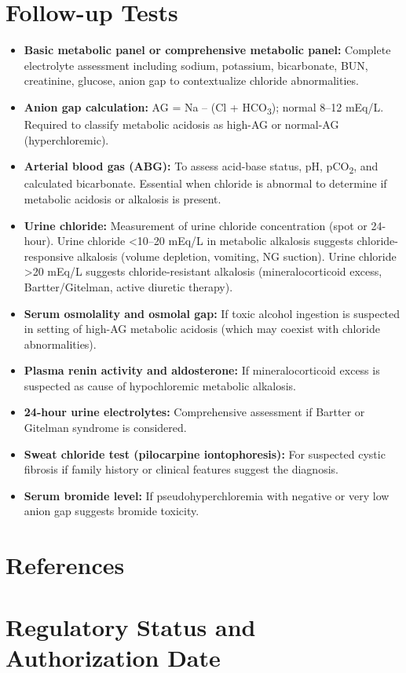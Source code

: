 \section*{Follow-up Tests}
\begin{itemize}
  \item \textbf{Basic metabolic panel or comprehensive metabolic panel:} Complete electrolyte assessment including sodium, potassium, bicarbonate, BUN, creatinine, glucose, anion gap to contextualize chloride abnormalities.
  \item \textbf{Anion gap calculation:} AG = Na -- (Cl + HCO\textsubscript{3}); normal 8--12 mEq/L. Required to classify metabolic acidosis as high-AG or normal-AG (hyperchloremic).
  \item \textbf{Arterial blood gas (ABG):} To assess acid-base status, pH, pCO\textsubscript{2}, and calculated bicarbonate. Essential when chloride is abnormal to determine if metabolic acidosis or alkalosis is present.
  \item \textbf{Urine chloride:} Measurement of urine chloride concentration (spot or 24-hour). Urine chloride <10--20 mEq/L in metabolic alkalosis suggests chloride-responsive alkalosis (volume depletion, vomiting, NG suction). Urine chloride >20 mEq/L suggests chloride-resistant alkalosis (mineralocorticoid excess, Bartter/Gitelman, active diuretic therapy).
  \item \textbf{Serum osmolality and osmolal gap:} If toxic alcohol ingestion is suspected in setting of high-AG metabolic acidosis (which may coexist with chloride abnormalities).
  \item \textbf{Plasma renin activity and aldosterone:} If mineralocorticoid excess is suspected as cause of hypochloremic metabolic alkalosis.
  \item \textbf{24-hour urine electrolytes:} Comprehensive assessment if Bartter or Gitelman syndrome is considered.
  \item \textbf{Sweat chloride test (pilocarpine iontophoresis):} For suspected cystic fibrosis if family history or clinical features suggest the diagnosis.
  \item \textbf{Serum bromide level:} If pseudohyperchloremia with negative or very low anion gap suggests bromide toxicity.
\end{itemize}

\section*{References}



\clearpage
\section*{Regulatory Status and Authorization Date}

\clearpage
